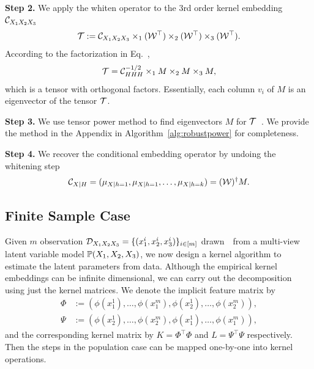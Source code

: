 \documentclass{article}
\begin{document}
{\bf Step 2.} We apply the whiten operator to the 3rd order kernel embedding $\mathcal{C}_{X_1 X_2 X_3}$
$$
  {\mathcal{T}} := \mathcal{C}_{X_1 X_2 X_3} \times_1 (\mathcal{W}^\top) \times_2 (\mathcal{W}^\top) \times_3 (\mathcal{W}^\top).
$$
According to the factorization in Eq.~,
$$
  {\mathcal{T}} = \mathcal{C}_{HHH}^{-1/2} \times_1 M \times_2 M \times_3 M,
$$
which is a tensor with orthogonal factors. Essentially, each column $v_i$ of $M$ is an eigenvector of the tensor ${\mathcal{T}}$.

{\bf Step 3.} We use tensor power method to find eigenvectors $M$ for ${\mathcal{T}}$~\cite{AnandkumarEtal:community12}. We provide the method in the Appendix in Algorithm~\ref{alg:robustpower} for completeness.

{\bf Step 4.} We recover the conditional embedding operator by undoing the whitening step
$$
  \mathcal{C}_{X|H} = (\mu_{X|h=1},\mu_{X|h=1},\ldots,\mu_{X|h=k}) = (\mathcal{W})^\dagger M.
$$

\subsection{Finite Sample Case}\label{sec:sample}

Given $m$ observation $\mathcal{D}_{X_1 X_2 X_3}=\{(x_1^i,x_2^i,x_3^i)\}_{i \in [m]}$ drawn~\iid~from a multi-view latent variable model $\mathbb{P}(X_1,X_2,X_3)$, we now design a kernel algorithm to estimate the latent parameters from data. Although the empirical kernel embeddings can be infinite dimensional, we can carry out the decomposition using just the kernel matrices.
We  denote the implicit feature matrix by
\begin{align*}
  \Phi &:= (\phi(x_1^1), \ldots, \phi(x_1^m), \phi(x_2^1),  \ldots, \phi(x_2^m)),  \\
  \Psi &:= (\phi(x_2^1), \ldots, \phi(x_2^m), \phi(x_1^1),  \ldots, \phi(x_1^m)),
\end{align*}
and the corresponding kernel matrix by $K = \Phi^\top \Phi$ and $L = \Psi^\top \Psi$ respectively.
Then the steps in the population case can be mapped one-by-one into kernel operations.
\end{document}
